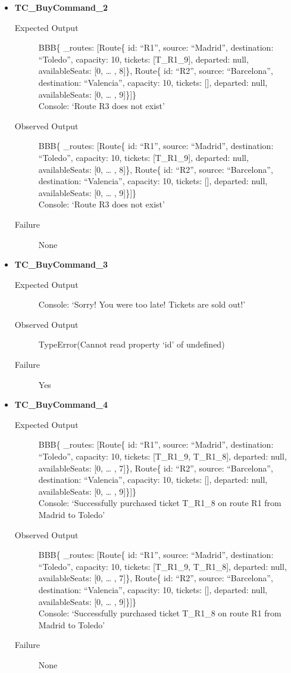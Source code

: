 \documentclass[11pt]{article}
\begin{document}
\begin{itemize}
\item \textbf{TC\_BuyCommand\_2}
\begin{description}
\item[{Expected Output}] BBB\{ \_routes: [Route\{ id: “R1”, source: “Madrid”, destination: “Toledo”, capacity: 10,  tickets: [T\_R1\_9], departed: null, availableSeats: [0, … , 8]\}, Route\{ id: “R2”, source: “Barcelona”, destination: “Valencia”, capacity: 10,  tickets: [], departed: null, availableSeats: [0, … , 9]\}]\}\\
Console: ‘Route R3 does not exist’
\item[{Observed Output}] BBB\{ \_routes: [Route\{ id: “R1”, source: “Madrid”, destination: “Toledo”, capacity: 10,  tickets: [T\_R1\_9], departed: null, availableSeats: [0, … , 8]\}, Route\{ id: “R2”, source: “Barcelona”, destination: “Valencia”, capacity: 10,  tickets: [], departed: null, availableSeats: [0, … , 9]\}]\}\\
Console: ‘Route R3 does not exist’
\item[{Failure}] None
\end{description}

\item \textbf{TC\_BuyCommand\_3}
\begin{description}
\item[{Expected Output}] Console: ‘Sorry! You were too late! Tickets are sold out!’
\item[{Observed Output}] TypeError(Cannot read property ‘id’ of undefined)
\item[{Failure}] Yes
\end{description}

\item \textbf{TC\_BuyCommand\_4}
\begin{description}
\item[{Expected Output}] BBB\{ \_routes: [Route\{ id: “R1”, source: “Madrid”, destination: “Toledo”, capacity: 10,  tickets: [T\_R1\_9, T\_R1\_8], departed: null, availableSeats: [0, … , 7]\}, Route\{ id: “R2”, source: “Barcelona”, destination: “Valencia”, capacity: 10,  tickets: [], departed: null, availableSeats: [0, … , 9]\}]\}\\
Console: ‘Successfully purchased ticket T\_R1\_8 on route R1 from Madrid to Toledo’
\item[{Observed Output}] BBB\{ \_routes: [Route\{ id: “R1”, source: “Madrid”, destination: “Toledo”, capacity: 10,  tickets: [T\_R1\_9, T\_R1\_8], departed: null, availableSeats: [0, … , 7]\}, Route\{ id: “R2”, source: “Barcelona”, destination: “Valencia”, capacity: 10,  tickets: [], departed: null, availableSeats: [0, … , 9]\}]\}\\
Console: ‘Successfully purchased ticket T\_R1\_8 on route R1 from Madrid to Toledo’
\item[{Failure}] None
\end{description}


\end{itemize}
\end{document}
